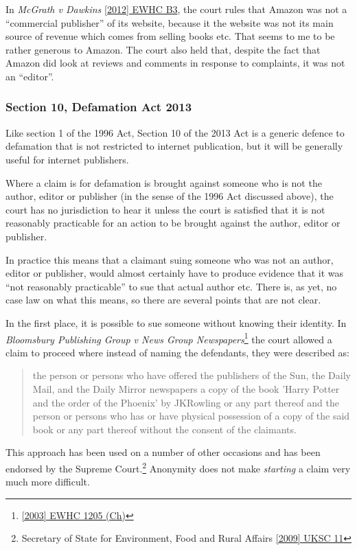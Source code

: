 \documentclass[]{article}
\begin{document}
In {\it McGrath v Dawkins} \href{http://www.bailii.org/ew/cases/EWHC/QB/2012/B3.html}{[2012] EWHC B3}, the court rules that Amazon was not a ``commercial publisher'' of its website, because it the website was not its main source of revenue which comes from selling books etc. That seems to me to be rather generous to Amazon. The court also held that, despite the fact that Amazon did look at reviews and comments in response to complaints, it was not an ``editor''.

\subsubsection{Section 10, Defamation Act 2013}
Like section 1 of the 1996 Act, Section 10 of the 2013 Act is a generic defence to defamation that is not restricted to internet publication, but it will be generally useful for internet publishers.

Where a claim is for defamation is brought against someone who is not the author, editor or publisher (in the sense of the 1996 Act discussed above), the court has no jurisdiction to hear it unless the court is satisfied that it is not reasonably practicable for an action to be brought against the author, editor or publisher.

In practice this means that a claimant suing someone who was not an author, editor or publisher, would almost certainly have to produce evidence that it was ``not reasonably practicable'' to sue that actual author etc. There is, as yet, no case law on what this means, so there are several points that are not clear.

In the first place, it is possible to sue someone without knowing their identity. In {\it Bloomsbury Publishing Group v News Group Newspapers}\footnote{\href{http://www.bailii.org/ew/cases/EWHC/Ch/2003/1205.html}{[2003] EWHC 1205 (Ch)}} the court allowed a claim to proceed where instead of naming the defendants, they were described as:

\begin{quote}
  the person or persons who have offered the publishers of the Sun, the Daily Mail, and the Daily Mirror newspapers a copy of the book 'Harry Potter and the order of the Phoenix' by JKRowling or any part thereof and the person or persons who has or have physical possession of a copy of the said book or any part thereof without the consent of the claimants.
\end{quote}

This approach has been used on a number of other occasions and has been endorsed by the Supreme Court.\footnote{Secretary of State for Environment, Food and Rural Affairs \href{http://www.bailii.org/uk/cases/UKSC/2009/11.html}{[2009] UKSC 11}} Anonymity does not make {\it starting} a claim very much more difficult. 
\end{document}

